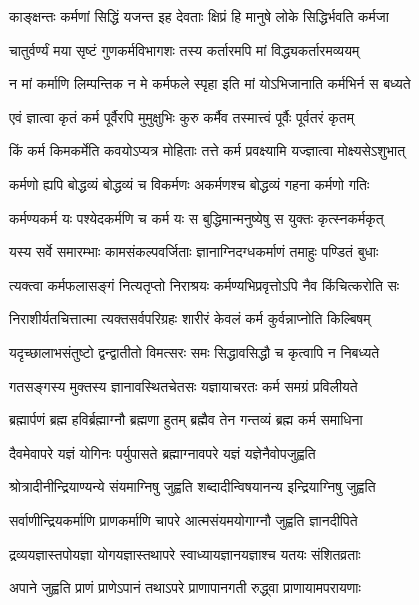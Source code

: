 \twolineshloka
{काङ्क्षन्तः कर्मणां सिद्धिं यजन्त इह देवताः}
{क्षिप्रं हि मानुषे लोके सिद्धिर्भवति कर्मजा}


\twolineshloka
{चातुर्वर्ण्यं मया सृष्टं गुणकर्मविभागशः}
{तस्य कर्तारमपि मां विद्ध्यकर्तारमव्ययम्}


\twolineshloka
{न मां कर्माणि लिम्पन्तिक न मे कर्मफले स्पृहा}
{इति मां योऽभिजानाति कर्मभिर्न स बध्यते}


\twolineshloka
{एवं ज्ञात्वा कृतं कर्म पूर्वैरपि मुमुक्षुभिः}
{कुरु कर्मैव तस्मात्त्वं पूर्वैः पूर्वतरं कृतम्}


\twolineshloka
{किं कर्म किमकर्मेति कवयोऽप्यत्र मोहिताः}
{तत्ते कर्म प्रवक्ष्यामि यज्ज्ञात्वा मोक्ष्यसेऽशुभात्}


\twolineshloka
{कर्मणो ह्यपि बोद्धव्यं बोद्धव्यं च विकर्मणः}
{अकर्मणश्च बोद्धव्यं गहना कर्मणो गतिः}


\twolineshloka
{कर्मण्यकर्म यः पश्येदकर्मणि च कर्म यः}
{स बुद्धिमान्मनुष्येषु स युक्तः कृत्स्नकर्मकृत्}


\twolineshloka
{यस्य सर्वे समारम्भाः कामसंकल्पवर्जिताः}
{ज्ञानाग्निदग्धकर्माणं तमाहुः पण्डितं बुधाः}


\twolineshloka
{त्यक्त्वा कर्मफलासङ्गं नित्यतृप्तो निराश्रयः}
{कर्मण्यभिप्रवृत्तोऽपि नैव किंचित्करोति सः}


\twolineshloka
{निराशीर्यतचित्तात्मा त्यक्तसर्वपरिग्रहः}
{शारीरं केवलं कर्म कुर्वन्नाप्नोति किल्बिषम्}


\twolineshloka
{यदृच्छालाभसंतुष्टो द्वन्द्वातीतो विमत्सरः}
{समः सिद्धावसिद्धौ च कृत्वापि न निबध्यते}


\twolineshloka
{गतसङ्गस्य मुक्तस्य ज्ञानावस्थितचेतसः}
{यज्ञायाचरतः कर्म समग्रं प्रविलीयते}


\twolineshloka
{ब्रह्मार्पणं ब्रह्म हविर्ब्रह्माग्नौ ब्रह्मणा हुतम्}
{ब्रह्मैव तेन गन्तव्यं ब्रह्म कर्म समाधिना}


\twolineshloka
{दैवमेवापरे यज्ञं योगिनः पर्युपासते}
{ब्रह्माग्नावपरे यज्ञं यज्ञेनैवोपजुह्वति}


\twolineshloka
{श्रोत्रादीनीन्द्रियाण्यन्ये संयमाग्निषु जुह्वति}
{शब्दादीन्विषयानन्य इन्द्रियाग्निषु जुह्वति}


\twolineshloka
{सर्वाणीन्द्रियकर्माणि प्राणकर्माणि चापरे}
{आत्मसंयमयोगाग्नौ जुह्वति ज्ञानदीपिते}


\twolineshloka
{द्रव्ययज्ञास्तपोयज्ञा योगयज्ञास्तथापरे}
{स्वाध्यायज्ञानयज्ञाश्च यतयः संशितव्रताः}


\twolineshloka
{अपाने जुह्वति प्राणं प्राणेऽपानं तथाऽपरे}
{प्राणापानगती रुद्ध्वा प्राणायामपरायणाः}


